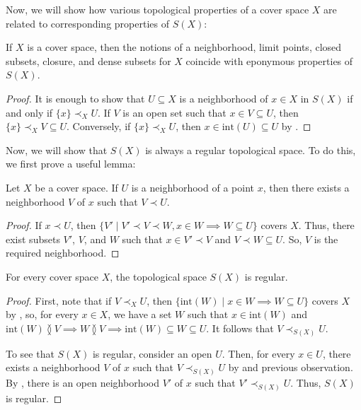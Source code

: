 \documentclass[reqno]{amsart}
\theoremstyle{definition}
\theoremstyle{remark}
\numberwithin{figure}{section}
\newcommand{\overlap}[2]{#1 \between #2}
\newcommand{\rb}{\prec}
\begin{document}
Now, we will show how various topological properties of a cover space $X$ are related to corresponding properties of $S(X)$:

\begin{prop}
If $X$ is a cover space, then the notions of a neighborhood, limit points, closed subsets, closure, and dense subsets for $X$ coincide with eponymous properties of $S(X)$.
\end{prop}
\begin{proof}
It is enough to show that $U \subseteq X$ is a neighborhood of $x \in X$ in $S(X)$ if and only if $\{ x \} \rb_X U$.
If $V$ is an open set such that $x \in V \subseteq U$, then $\{ x \} \rb_X V \subseteq U$.
Conversely, if $\{ x \} \rb_X U$, then $x \in \mathrm{int}(U) \subseteq U$ by .
\end{proof}


Now, we will show that $S(X)$ is always a regular topological space.
To do this, we first prove a useful lemma:

\begin{lem}[rb-point]
Let $X$ be a cover space.
If $U$ is a neighborhood of a point $x$, then there exists a neighborhood $V$ of $x$ such that $V \rb U$.
\end{lem}
\begin{proof}
If $x \rb U$, then $\{ V' \mid V' \rb V \rb W, x \in W \implies W \subseteq U \}$ covers $X$.
Thus, there exist subsets $V'$, $V$, and $W$ such that $x \in V' \rb V$ and $V \rb W \subseteq U$.
So, $V$ is the required neighborhood.
\end{proof}

\begin{prop}
For every cover space $X$, the topological space $S(X)$ is regular.
\end{prop}
\begin{proof}
First, note that if $V \rb_X U$, then $\{ \mathrm{int}(W) \mid x \in W \implies W \subseteq U \}$ covers $X$ by ,
so, for every $x \in X$, we have a set $W$ such that $x \in \mathrm{int}(W)$ and $\overlap{\mathrm{int}(W)}{V} \implies \overlap{W}{V} \implies \mathrm{int}(W) \subseteq W \subseteq U$.
It follows that $V \rb_{S(X)} U$.

To see that $S(X)$ is regular, consider an open $U$.
Then, for every $x \in U$, there exists a neighborhood $V$ of $x$ such that $V \rb_{S(X)} U$ by  and previous observation.
By , there is an open neighborhood $V'$ of $x$ such that $V' \rb_{S(X)} U$.
Thus, $S(X)$ is regular.
\end{proof}
\end{document}
